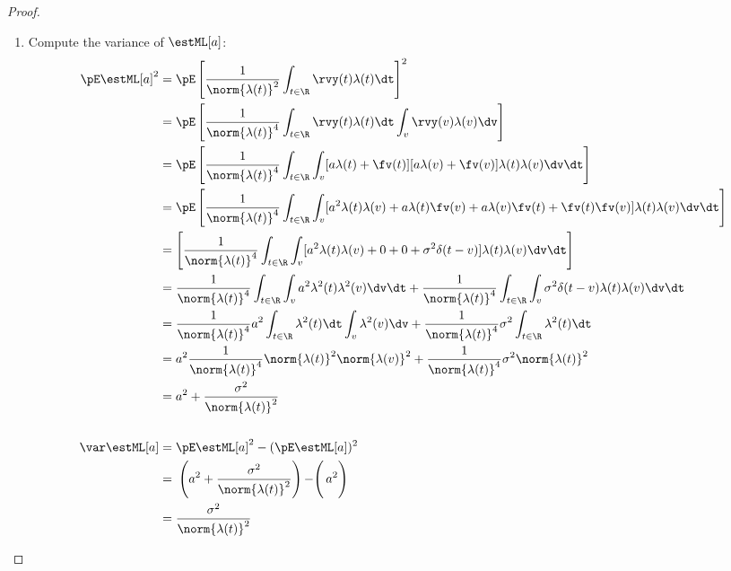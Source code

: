 \begin{proof}
\begin{enumerate}
\item Compute the variance of $\estML[a]$:
\begin{align*}
  \pE \estML[a]^2
    &= \pE \left[ \frac{1}{\norm{\lambda(t)}^2} \int_{t\in\R} \rvy(t)\lambda(t) \dt\right]^2
  \\&= \pE \left[  \frac{1}{\norm{\lambda(t)}^4}
        \int_{t\in\R} \rvy(t)\lambda(t) \dt \int_v \rvy(v)\lambda(v) \dv
        \right]
  \\&= \pE \left[  \frac{1}{\norm{\lambda(t)}^4}
        \int_{t\in\R} \int_v [a\lambda(t) + \fv(t)][a\lambda(v) + \fv(v)]
        \lambda(t) \lambda(v)
        \dv\dt \right]
  \\&= \pE \left[  \frac{1}{\norm{\lambda(t)}^4}
        \int_{t\in\R} \int_v
        [a^2\lambda(t)\lambda(v) + a\lambda(t)\fv(v) + a\lambda(v)\fv(t) + \fv(t)\fv(v)]
        \lambda(t) \lambda(v)
        \dv\dt \right]
  \\&= \left[  \frac{1}{\norm{\lambda(t)}^4}
        \int_{t\in\R} \int_v
        [a^2\lambda(t)\lambda(v) + 0 + 0 + \sigma^2\delta(t-v)]
        \lambda(t) \lambda(v)
        \dv\dt \right]
  \\&= \frac{1}{\norm{\lambda(t)}^4}
        \int_{t\in\R} \int_v a^2\lambda^2(t)\lambda^2(v) \dv\dt +
        \frac{1}{\norm{\lambda(t)}^4}
        \int_{t\in\R} \int_v \sigma^2\delta(t-v) \lambda(t) \lambda(v) \dv\dt
  \\&= \frac{1}{\norm{\lambda(t)}^4}
        a^2 \int_{t\in\R} \lambda^2(t) \dt \int_v \lambda^2(v) \dv +
        \frac{1}{\norm{\lambda(t)}^4}
        \sigma^2\int_{t\in\R} \lambda^2(t) \dt
  \\&= a^2 \frac{1}{\norm{\lambda(t)}^4}
        \norm{\lambda(t)}^2 \norm{\lambda(v)}^2 +
        \frac{1}{\norm{\lambda(t)}^4}
        \sigma^2 \norm{\lambda(t)}^2
  \\&= a^2 + \frac{\sigma^2}{\norm{\lambda(t)}^2}
\\
\\
  \var\estML[a]
    &= \pE \estML[a]^2 - (\pE \estML[a])^2
  \\&= \left.\left.\left(a^2 + \frac{\sigma^2}{\norm{\lambda(t)}^2}\right) - \right( a^2 \right)
  \\&= \frac{\sigma^2}{\norm{\lambda(t)}^2}
\end{align*}


\end{enumerate}
\end{proof}

